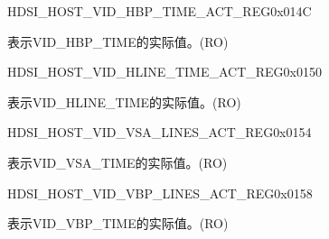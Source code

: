     
    \begin{register}{H}{DSI\_HOST\_VID\_HBP\_TIME\_ACT\_REG}{0x014C}\label{regdesc:DSIHOSTVIDHBPTIMEACTREG}
    \regnewline%
    \begin{regdesc}\begin{reglist}
    \label{fielddesc:DSIHOSTVIDHBPTIMEACT}\item [DSI\_HOST\_VID\_HBP\_TIME\_ACT] 表示VID\_HBP\_TIME的实际值。(RO)
    \end{reglist}\end{regdesc}
    \end{register}
    
    
    \begin{register}{H}{DSI\_HOST\_VID\_HLINE\_TIME\_ACT\_REG}{0x0150}\label{regdesc:DSIHOSTVIDHLINETIMEACTREG}
    \regnewline%
    \begin{regdesc}\begin{reglist}
    \label{fielddesc:DSIHOSTVIDHLINETIMEACT}\item [DSI\_HOST\_VID\_HLINE\_TIME\_ACT] 表示VID\_HLINE\_TIME的实际值。(RO)
    \end{reglist}\end{regdesc}
    \end{register}
    
    
    \begin{register}{H}{DSI\_HOST\_VID\_VSA\_LINES\_ACT\_REG}{0x0154}\label{regdesc:DSIHOSTVIDVSALINESACTREG}
    \regnewline%
    \begin{regdesc}\begin{reglist}
    \label{fielddesc:DSIHOSTVSALINESACT}\item [DSI\_HOST\_VSA\_LINES\_ACT] 表示VID\_VSA\_TIME的实际值。(RO)
    \end{reglist}\end{regdesc}
    \end{register}
    
    
    \begin{register}{H}{DSI\_HOST\_VID\_VBP\_LINES\_ACT\_REG}{0x0158}\label{regdesc:DSIHOSTVIDVBPLINESACTREG}
    \regnewline%
    \begin{regdesc}\begin{reglist}
    \label{fielddesc:DSIHOSTVBPLINESACT}\item [DSI\_HOST\_VBP\_LINES\_ACT] 表示VID\_VBP\_TIME的实际值。(RO)
    \end{reglist}\end{regdesc}
    \end{register}
    
